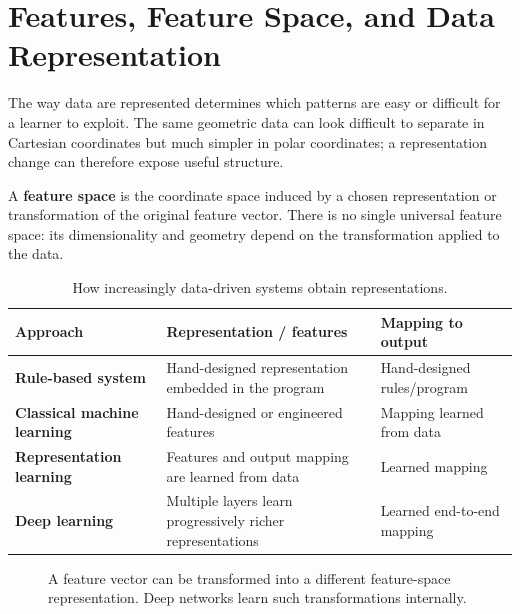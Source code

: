 \documentclass[11pt,a4paper]{report}
\newcommand{\vect}[1]{\bm{#1}}
\newcommand{\R}{\mathbb{R}}
\begin{document}
\section{Features, Feature Space, and Data Representation}

The way data are represented determines which patterns are easy or difficult for a learner to exploit. The same geometric data can look difficult to separate in Cartesian coordinates but much simpler in polar coordinates; a representation change can therefore expose useful structure.

\begin{definitionbox}
A \textbf{feature space} is the coordinate space induced by a chosen representation or transformation of the original feature vector. There is no single universal feature space: its dimensionality and geometry depend on the transformation applied to the data.
\end{definitionbox}

\begin{table}[H]
\centering
\caption{How increasingly data-driven systems obtain representations.}
\begin{tabularx}{\textwidth}{>{\raggedright\arraybackslash\bfseries}p{}>{\raggedright\arraybackslash}X>{\raggedright\arraybackslash}X}
\toprule
\rowcolor{Primary}
\color{white}Approach & \color{white}Representation / features & \color{white}Mapping to output \\
\midrule
Rule-based system & Hand-designed representation embedded in the program & Hand-designed rules/program \\
Classical machine learning & Hand-designed or engineered features & Mapping learned from data \\
Representation learning & Features and output mapping are learned from data & Learned mapping \\
Deep learning & Multiple layers learn progressively richer representations & Learned end-to-end mapping \\
\bottomrule
\end{tabularx}
\end{table}

\begin{figure}[H]
\centering
{}
\caption{A feature vector can be transformed into a different feature-space representation. Deep networks learn such transformations internally.}
\label{fig:feature-space}
\end{figure}
\end{document}
